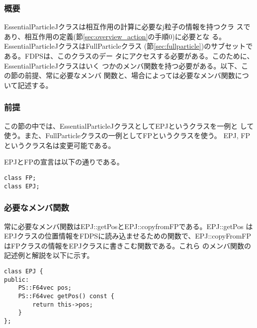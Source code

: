 \subsubsection{概要}

EssentialParticleJクラスは相互作用の計算に必要なj粒子の情報を持つクラ
スであり、相互作用の定義(節\ref{sec:overview_action}の手順0)に必要とな
る。EssentialParticleJクラスはFullParticleクラス
(節\ref{sec:fullparticle})のサブセットである。FDPSは、このクラスのデー
タにアクセスする必要がある。このために、EssentialParticleJクラスはいく
つかのメンバ関数を持つ必要がある。以下、この節の前提、常に必要なメンバ
関数と、場合によっては必要なメンバ関数について記述する。

\subsubsection{前提}

この節の中では、EssentialParticleJクラスとしてEPJというクラスを一例と
して使う。また、FullParticleクラスの一例としてFPというクラスを使う。
EPJ, FPというクラス名は変更可能である。

EPJとFPの宣言は以下の通りである。
\begin{screen}
\begin{verbatim}
class FP;
class EPJ;
\end{verbatim}
\end{screen}

\subsubsection{必要なメンバ関数}


常に必要なメンバ関数はEPJ::getPosとEPJ::copyfromFPである。EPJ::getPos
はEPJクラスの位置情報をFDPSに読み込ませるための関数で、EPJ::copyFromFP
はFPクラスの情報をEPJクラスに書きこむ関数である。これら
のメンバ関数の記述例と解説を以下に示す。


\begin{screen}
\begin{verbatim}
class EPJ {
public:
    PS::F64vec pos;
    PS::F64vec getPos() const {
        return this->pos;
    }
};
\end{verbatim}
\end{screen}

